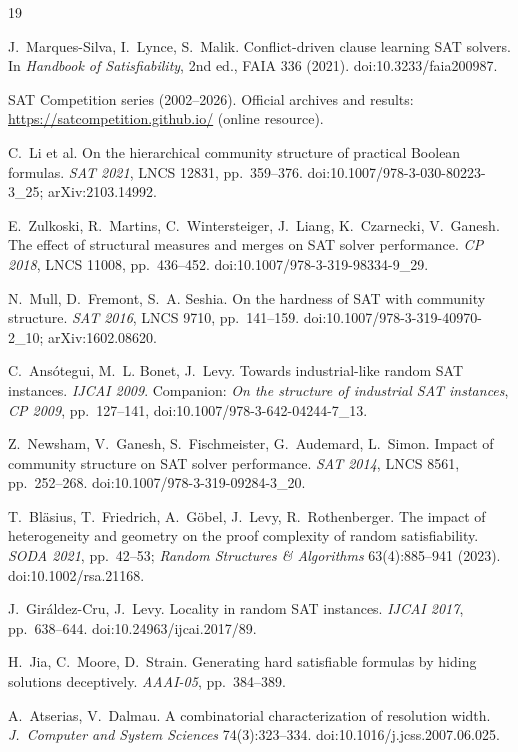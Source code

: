 \documentclass[11pt]{article}
\begin{document}
\begin{thebibliography}{19}\small

 J.~Marques-Silva, I.~Lynce, S.~Malik. Conflict-driven
clause learning SAT solvers. In \emph{Handbook of Satisfiability}, 2nd ed.,
FAIA 336 (2021). doi:10.3233/faia200987.

 SAT Competition series (2002--2026). Official archives and
results: \url{https://satcompetition.github.io/} (online resource).

 C.~Li et al. On the hierarchical community structure of
practical Boolean formulas. \emph{SAT 2021}, LNCS 12831, pp.~359--376.
doi:10.1007/978-3-030-80223-3\_25; arXiv:2103.14992.

 E.~Zulkoski, R.~Martins, C.~Wintersteiger, J.~Liang,
K.~Czarnecki, V.~Ganesh. The effect of structural measures and merges on SAT
solver performance. \emph{CP 2018}, LNCS 11008, pp.~436--452.
doi:10.1007/978-3-319-98334-9\_29.

 N.~Mull, D.~Fremont, S.~A. Seshia. On the hardness of SAT
with community structure. \emph{SAT 2016}, LNCS 9710, pp.~141--159.
doi:10.1007/978-3-319-40970-2\_10; arXiv:1602.08620.

 C.~Ans\'otegui, M.~L. Bonet, J.~Levy. Towards
industrial-like random SAT instances. \emph{IJCAI 2009}. Companion:
\emph{On the structure of industrial SAT instances}, \emph{CP 2009},
pp.~127--141, doi:10.1007/978-3-642-04244-7\_13.

 Z.~Newsham, V.~Ganesh, S.~Fischmeister, G.~Audemard,
L.~Simon. Impact of community structure on SAT solver performance.
\emph{SAT 2014}, LNCS 8561, pp.~252--268. doi:10.1007/978-3-319-09284-3\_20.

 T.~Bl\"asius, T.~Friedrich, A.~G\"obel, J.~Levy,
R.~Rothenberger. The impact of heterogeneity and geometry on the proof
complexity of random satisfiability. \emph{SODA 2021}, pp.~42--53;
\emph{Random Structures \& Algorithms} 63(4):885--941 (2023).
doi:10.1002/rsa.21168.

 J.~Gir\'aldez-Cru, J.~Levy. Locality in random SAT
instances. \emph{IJCAI 2017}, pp.~638--644. doi:10.24963/ijcai.2017/89.

 H.~Jia, C.~Moore, D.~Strain. Generating hard satisfiable
formulas by hiding solutions deceptively. \emph{AAAI-05}, pp.~384--389.

 A.~Atserias, V.~Dalmau. A combinatorial
characterization of resolution width. \emph{J.~Computer and System Sciences}
74(3):323--334. doi:10.1016/j.jcss.2007.06.025.


\end{thebibliography}
\end{document}

